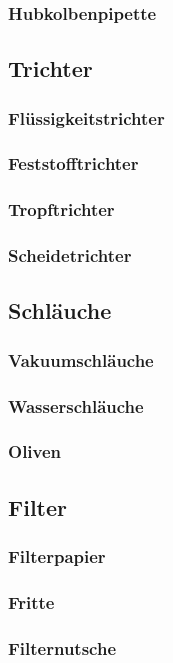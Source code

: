 \subsubsection{Hubkolbenpipette}

\subsection{Trichter}
\subsubsection{Flüssigkeitstrichter}
\subsubsection{Feststofftrichter}
\subsubsection{Tropftrichter}
\subsubsection{Scheidetrichter}

\subsection{Schläuche}
\subsubsection{Vakuumschläuche}
\subsubsection{Wasserschläuche}
\subsubsection{Oliven}

\subsection{Filter}
\subsubsection{Filterpapier}
\subsubsection{Fritte}
\subsubsection{Filternutsche}

